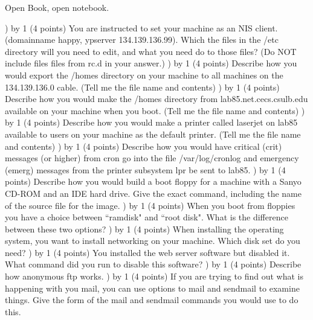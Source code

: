 
\parindent=0in
\nopagenumbers
\newcount\quesno
{}
\def\ques{\number\quesno) \advance\quesno by 1}
\def\aspace{\vskip 1.5in}

Open Book, open notebook.

\ques
(4 points)
You are instructed to set your machine as an NIS client. (domainname happy,
ypserver 134.139.136.99).  Which the files in the {\ltt{}/etc}
directory will you need to edit, and what you need do to those files?
(Do NOT include files files from {\ltt{}rc.d} in your answer.)
\vskip 1.0in
\ques
(4 points)
Describe how you would
export the {\ltt{}/homes} directory on your machine to all
machines on the 134.139.136.0 cable.
(Tell me the file name and contents)
\vskip 1.0in
\ques
(4 points)
Describe how you would make
the {\ltt{}/homes} directory from {\ltt{}lab85.net.cecs.csulb.edu}
available on your machine when you boot.
(Tell me the file name and contents)
\vskip 1.0in
\ques
(4 points)
Describe how you would make
a printer called {\ltt{}laserjet} on {\ltt{}lab85} available to
users on your machine as the default printer.
(Tell me the file name and contents)
\vskip 1.0in
\ques
(4 points)
Describe how you would have
critical ({\ltt{}crit}) messages (or higher) from {\ltt{}cron}
go into the file {\ltt{}/var/log/cronlog}
and
emergency ({\ltt{}emerg}) messages from the printer subsystem {\ltt{}lpr}
be sent to {\ltt{}lab85}.
\vskip 1.8in
\ques
(4 points)
Describe how you would build a boot floppy for a machine with a
Sanyo CD-ROM and an IDE hard drive.
Give the exact command, including the name of the source file for
the image.
\vskip 1.0in
\ques
(4 points)
When you boot from floppies you have a choice 
between ``ramdisk" and ``root disk".
What is the difference between these two options?
\vskip 1.0in
\ques
(4 points)
When installing the operating system, 
you want to install networking on your machine.
Which disk set do you need?
\vskip 0.5in
\ques
(4 points)
You installed the web server software but disabled it.
What command did you run to disable this software?
\vskip 0.5in
\ques
(4 points)
Describe how anonymous ftp works.
\vskip 1.0in
\ques
(4 points)
If you are trying to find out what is happening with you mail,
you can use options to mail and sendmail to examine things.
Give the form of the mail and sendmail commands you would use to do this.
